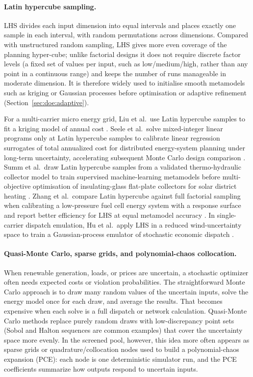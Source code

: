 \paragraph{Latin hypercube sampling.}
LHS divides each input dimension into equal intervals and places exactly
one sample in each interval, with random permutations across dimensions.
Compared with unstructured random sampling, LHS gives more even coverage
of the planning hyper-cube; unlike factorial designs it does not require
discrete factor levels (a fixed set of values per input, such as
low/medium/high, rather than any point in a continuous range) and keeps
the number of runs manageable in moderate dimension. It is therefore widely used to initialise smooth
metamodels such as kriging or Gaussian processes before optimisation or
adaptive refinement (Section~\ref{sec:doe:adaptive}).

For a multi-carrier micro energy grid, Liu et al.\ use Latin hypercube
samples to fit a kriging model of annual cost \cite{Liu201914569}.
Seele et al.\ solve mixed-integer linear programs only at Latin hypercube
samples to calibrate linear regression surrogates of total annualized
cost for distributed energy-system planning under long-term uncertainty,
accelerating subsequent Monte Carlo design comparison
\cite{Seele20232480}. Summ et al.\ draw Latin hypercube samples from a
validated thermo-hydraulic collector model to train supervised
machine-learning metamodels before multi-objective optimisation of
insulating-glass flat-plate collectors for solar district heating
\cite{Summ2025}. Zhang et al.\ compare Latin hypercube against full
factorial sampling when calibrating a low-pressure fuel cell energy
system with a response surface and report better efficiency for LHS at
equal metamodel accuracy \cite{Zhang2025__7}. In single-carrier
dispatch emulation, Hu et al.\ apply LHS in a reduced wind-uncertainty
space to train a Gaussian-process emulator of stochastic economic
dispatch \cite{Hu2021671}.

\paragraph{Quasi-Monte Carlo, sparse grids, and polynomial-chaos collocation.}
When renewable generation, loads, or prices are uncertain, a stochastic
optimizer often needs expected costs or violation probabilities.
The straightforward Monte Carlo approach is to draw many random values
of the uncertain inputs, solve the energy model once for each draw, and
average the results. That becomes expensive when each solve is a full
dispatch or network calculation. Quasi-Monte Carlo methods replace
purely random draws with low-discrepancy point sets (Sobol and Halton
sequences are common examples) that cover the uncertainty space more
evenly. In the screened pool, however, this idea more often appears as
sparse grids or quadrature/collocation nodes used to build a
polynomial-chaos expansion (PCE): each node is one deterministic
simulator run, and the PCE coefficients summarize how outputs respond
to uncertain inputs.

